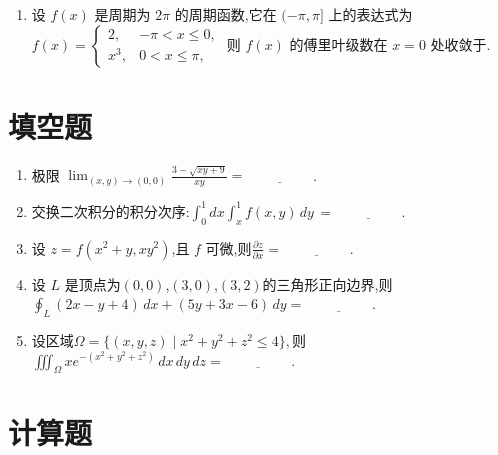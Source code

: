 \begin{enumerate}
	\item 设 $f(x)$ 是周期为 $2\pi$ 的周期函数,它在 $(-\pi,\pi]$ 上的表达式为$f(x)=
		\begin{cases}
			2, & -\pi<x\le 0,\\
			x^3, & 0<x\le \pi,
		\end{cases}$
	则 $f(x)$ 的傅里叶级数在 $x=0$ 处收敛于\underline{\hspace{2cm}}.
\end{enumerate}

\section{填空题}

\begin{enumerate}
	\item 极限 $\displaystyle \lim_{(x,y)\to(0,0)} \frac{3-\sqrt{xy+9}}{xy}=\underline{\hspace{2cm}}$.
	
	\item 交换二次积分的积分次序:$\int_0^1 dx \int_x^1 f(x,y)\,dy\,=\underline{\hspace{2cm}}.$
	
	\item 设 $z=f(x^2+y,xy^2)$,且 $f$ 可微,则$\frac{\partial z}{\partial x}=\underline{\hspace{2cm}}.$
	
	\item 设 $L$ 是顶点为$(0,0)$,$(3,0)$,$(3,2)$的三角形正向边界,则$\oint_L(2x-y+4)\,dx+(5y+3x-6)\,dy=\underline{\hspace{2cm}}.$
	
	\item 设区域$\Omega=\{(x,y,z)\mid x^2+y^2+z^2\le 4\},$则$\iiint_{\Omega}xe^{-(x^2+y^2+z^2)}\,dx\,dy\,dz=\underline{\hspace{2cm}}.$
\end{enumerate}

\section{计算题}

